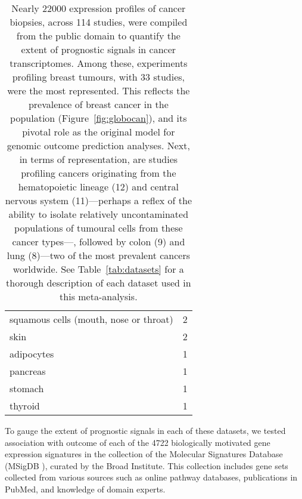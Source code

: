 \begin{table}[ht]
\begin{tabular}{lD{.}{.}{-1}}
    squamous cells (mouth, nose or throat) & 2                                            \\
    skin                                   & 2                                            \\
    adipocytes                             & 1                                            \\
    pancreas                               & 1                                            \\
    stomach                                & 1                                            \\
    thyroid                                & 1                                            \\
    \bottomrule
  \end{tabular}
  \caption[Distribution of tissues of origin in the cancers studies probed for
  prognostic signals]{Nearly \num{22000} expression profiles of cancer
    biopsies, across 114 studies, were compiled from the
    public domain to quantify the extent of prognostic signals in cancer
    transcriptomes.  Among these, experiments profiling breast tumours, with 33
    studies, were the most represented. This reflects the prevalence of breast
    cancer in the population (Figure~\ref{fig:globocan}), and its pivotal
    role as the original model for genomic outcome prediction analyses.  Next, in terms
    of representation, are studies profiling cancers originating from the
    hematopoietic lineage (12) and central nervous system (11)---perhaps a
    reflex of the ability to isolate relatively uncontaminated populations of tumoural cells from
    these cancer types---, followed by colon (9) and lung (8)---two of the most prevalent cancers
    worldwide.  See Table~\ref{tab:datasets} for a thorough description of each dataset used in
    this meta-analysis.}
  \label{tab:cancer-tissues}
\end{table}

To gauge the extent of prognostic signals in each of these datasets, we tested
association with outcome of each of the 4722 biologically motivated gene
expression signatures in the  collection of the Molecular
Signatures Database (MSigDB ), curated by the Broad Institute.
This collection includes gene sets collected from various sources such as online
pathway databases, publications in PubMed, and knowledge of domain experts.

